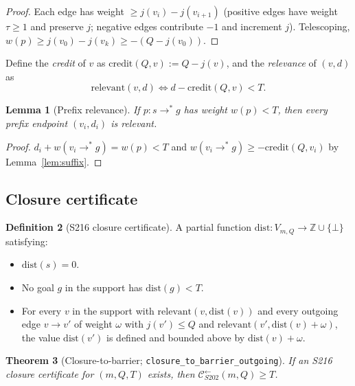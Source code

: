 \documentclass[11pt,a4paper]{article}
\theoremstyle{plain}
\newtheorem{theorem}{Theorem}[section]
\newtheorem{lemma}[theorem]{Lemma}
\theoremstyle{definition}
\newtheorem{definition}[theorem]{Definition}
\newcommand{\ZZ}{\mathbb{Z}}
\newcommand{\credit}{\mathrm{credit}}
\newcommand{\relevant}{\mathrm{relevant}}
\newcommand{\Cback}{\mathcal{C}^{\!\leftarrow}_{S202}}
\begin{document}
\begin{proof}
Each edge has weight $\ge j(v_i) - j(v_{i+1})$ (positive edges have
weight $\tau \ge 1$ and preserve $j$; negative edges contribute $-1$
and increment $j$). Telescoping,
$w(p) \ge j(v_0) - j(v_k) \ge -(Q - j(v_0))$.
\end{proof}

Define the \emph{credit} of $v$ as $\credit(Q, v) := Q - j(v)$, and
the \emph{relevance} of $(v, d)$ as
\[
  \relevant(v, d) \iff d - \credit(Q, v) < T.
\]

\begin{lemma}[Prefix relevance]\label{lem:relevance}
If $p : s \to^{*} g$ has weight $w(p) < T$, then every prefix endpoint
$(v_i, d_i)$ is relevant.
\end{lemma}

\begin{proof}
$d_i + w(v_i \to^* g) = w(p) < T$ and
$w(v_i \to^* g) \ge -\credit(Q, v_i)$ by
Lemma~\ref{lem:suffix}.
\end{proof}

\subsection{Closure certificate}

\begin{definition}[S216 closure certificate]\label{def:cert}
A partial function $\mathrm{dist} : V_{m, Q} \to \ZZ \cup \{\bot\}$
satisfying:
\begin{itemize}
\item[(C1)] $\mathrm{dist}(s) = 0$.
\item[(C2)] No goal $g$ in the support has $\mathrm{dist}(g) < T$.
\item[(C3)] For every $v$ in the support with $\relevant(v, \mathrm{dist}(v))$
            and every outgoing edge $v \to v'$ of weight $\omega$ with
            $j(v') \le Q$ and
            $\relevant(v', \mathrm{dist}(v) + \omega)$,
            the value $\mathrm{dist}(v')$ is defined and bounded
            above by $\mathrm{dist}(v) + \omega$.
\end{itemize}
\end{definition}

\begin{theorem}[Closure-to-barrier; \texttt{closure\_to\_barrier\_outgoing}]\label{thm:closure-to-barrier}
If an S216 closure certificate for $(m, Q, T)$ exists, then
$\Cback(m, Q) \ge T$.
\end{theorem}
\end{document}
